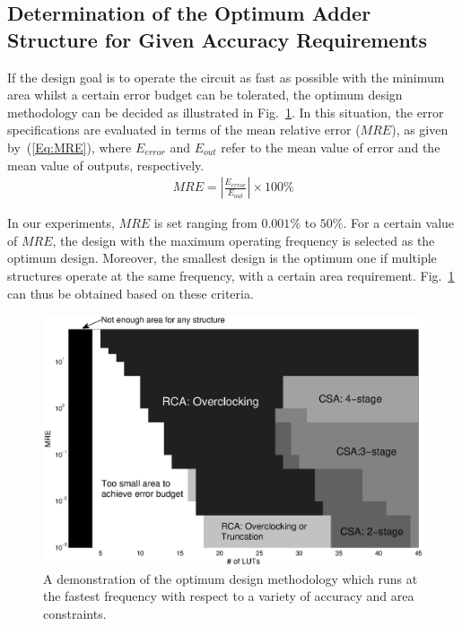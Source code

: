 \documentclass[prodmode,acmtrets]{acmsmall} %
\begin{document}
\vspace{-0.5ex}
\subsection{Determination of the Optimum Adder Structure for Given Accuracy Requirements}
If the design goal is to operate the circuit as fast as possible with the minimum area whilst a certain error budget can be tolerated, the optimum design methodology can be decided as illustrated in Fig.~\ref{Fig_CSA_Tradeoff_Error}. In this situation, the error specifications are evaluated in terms of the mean relative error ($MRE$), as given by~(\ref{Eq:MRE}), where $E_{error}$ and $E_{out}$ refer to the mean value of error and the mean value of outputs, respectively.
%
\begin{eqnarray}\label{Eq:MRE}
  MRE=\left|\frac{E_{error}}{E_{out}}\right|\times 100\%
\end{eqnarray}

In our experiments, $MRE$ is set ranging from $0.001\%$ to $50\%$. For a certain value of $MRE$, the design with the maximum operating frequency is selected as the optimum design. Moreover, the smallest design is the optimum one if multiple structures operate at the same frequency, with a certain area requirement. Fig.~\ref{Fig_CSA_Tradeoff_Error} can thus be obtained based on these criteria.
%
\begin{figure}[t]
    \centering
    \vspace{-2ex}
    \includegraphics[width=4.5in]{./Figures/Tradeoff_Error2.eps}
    \vspace{-2.5ex}
    \caption{A demonstration of the optimum design methodology which runs at the fastest frequency with respect to a variety of accuracy and area constraints.}
    \label{Fig_CSA_Tradeoff_Error}
    \vspace{-1ex}
\end{figure}
\end{document}
